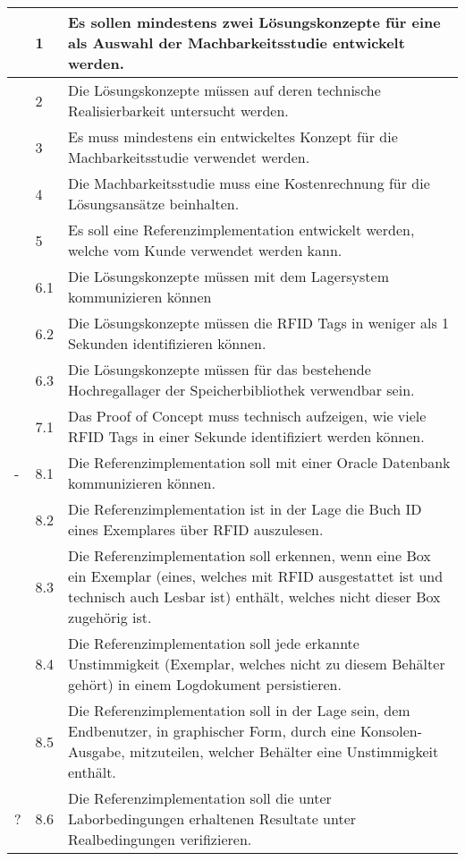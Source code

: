 \begin{tabularx}{\textwidth}{l l X}
	\hline
	\checkmark & 1   & Es sollen mindestens zwei Lösungskonzepte für eine als Auswahl der Machbarkeitsstudie entwickelt werden. \\
	\hline
	\checkmark & 2   & Die Lösungskonzepte müssen auf deren technische Realisierbarkeit untersucht werden. \\
	\hline
	\checkmark & 3   & Es muss mindestens ein entwickeltes Konzept für die Machbarkeitsstudie verwendet werden. \\
	\hline
	\checkmark & 4   & Die Machbarkeitsstudie muss eine Kostenrechnung für die Lösungsansätze beinhalten. \\
	\hline
	\checkmark & 5   & Es soll eine Referenzimplementation entwickelt werden, welche vom Kunde verwendet werden kann. \\
	\hline
	\checkmark & 6.1 & Die Lösungskonzepte müssen mit dem Lagersystem kommunizieren können \\
	\hline
	\checkmark & 6.2 & Die Lösungskonzepte müssen die RFID Tags in weniger als 1 Sekunden identifizieren können. \\
	\hline
	\checkmark & 6.3 & Die Lösungskonzepte müssen für das bestehende Hochregallager der Speicherbibliothek verwendbar sein. \\
	\hline
	\checkmark & 7.1 & Das Proof of Concept muss technisch aufzeigen, wie viele RFID Tags in einer Sekunde identifiziert werden können. \\
	\hline
	- & 8.1 & Die Referenzimplementation soll mit einer Oracle Datenbank kommunizieren können. \\
	\hline
	\checkmark & 8.2 & Die Referenzimplementation ist in der Lage die Buch ID eines Exemplares über RFID auszulesen. \\
	\hline
	\checkmark & 8.3 & Die Referenzimplementation soll erkennen, wenn eine Box ein Exemplar (eines, welches mit RFID ausgestattet ist und technisch auch Lesbar ist) enthält, welches nicht dieser Box zugehörig ist. \\
	\hline
	\checkmark & 8.4 & Die Referenzimplementation soll jede erkannte Unstimmigkeit (Exemplar, welches nicht zu diesem Behälter gehört) in einem Logdokument persistieren. \\
	\hline
	\checkmark & 8.5 & Die Referenzimplementation soll in der Lage sein, dem Endbenutzer, in graphischer Form, durch eine Konsolen-Ausgabe, mitzuteilen, welcher Behälter eine Unstimmigkeit enthält. \\
	\hline
	? & 8.6 & Die Referenzimplementation soll die unter Laborbedingungen erhaltenen Resultate unter Realbedingungen verifizieren. \\
	\hline
\end{tabularx}

